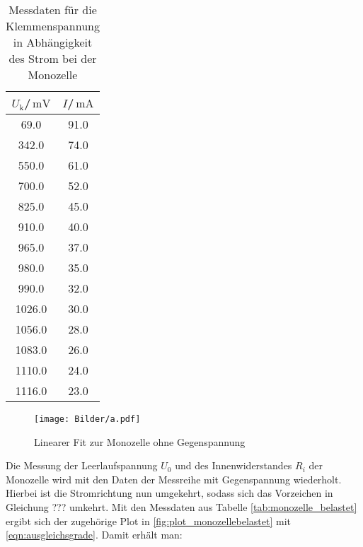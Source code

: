\begin{table}[h]
  \centering
  \caption{Messdaten für die Klemmenspannung in Abhängigkeit des Strom bei der Monozelle}
  \label{tab:mono}

\begin{tabular}{cc}
  \toprule
$U_\text{k}$/$\,\si{\milli\volt}$ & $I$/$\,\si{\milli\ampere}$\\
\midrule
69.0 & 91.0 \\
342.0 & 74.0 \\
550.0 & 61.0 \\
700.0 & 52.0 \\
825.0 & 45.0 \\
910.0 & 40.0 \\
965.0 & 37.0 \\
980.0 & 35.0 \\
990.0 & 32.0 \\
1026.0 & 30.0 \\
1056.0 & 28.0 \\
1083.0 & 26.0 \\
1110.0 & 24.0 \\
1116.0 & 23.0 \\
\bottomrule
\end{tabular}
\end{table}
\begin{figure}[h]
\texttt{[image: Bilder/a.pdf]}
\caption{Linearer Fit zur Monozelle ohne Gegenspannung}
\label{fig:plot_a}
\end{figure}


Die Messung der Leerlaufspannung $U_\text{0}$ und des Innenwiderstandes $R_i$ der Monozelle wird mit den Daten der Messreihe mit Gegenspannung wiederholt. Hierbei ist die Stromrichtung nun umgekehrt, sodass sich das Vorzeichen in Gleichung ??? umkehrt.
Mit den Messdaten aus Tabelle \ref{tab:monozelle_belastet} ergibt sich der zugehörige Plot in \ref{fig:plot_monozellebelastet} mit \eqref{eqn:ausgleichsgrade}. Damit erhält man:

